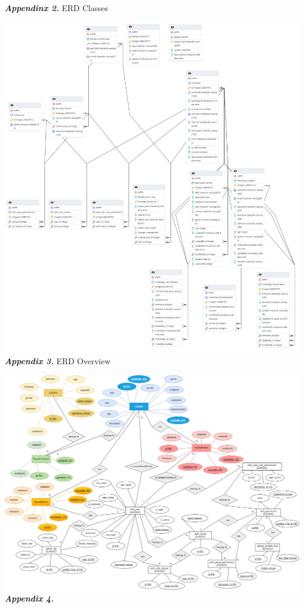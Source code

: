 \documentclass[letterpaper,twocolumn]{article}
\newcommand{\myparagraph}[1]{\vspace{0.1cm}\noindent \textbf{\textit{#1.}}}
\begin{document}
\clearpage
\myparagraph{Appendinx 2} ERD Classes

\includegraphics[scale=0.24]{images/ERDNewUpdated.png}\\[0.1cm] 

\clearpage
\myparagraph{Appendix 3} ERD Overview

\includegraphics[scale=0.30]{images/WebTechERDNewUpdated.drawio.png}\\[0.1cm] 

\clearpage
\myparagraph{Appendix 4} 
\end{document}
